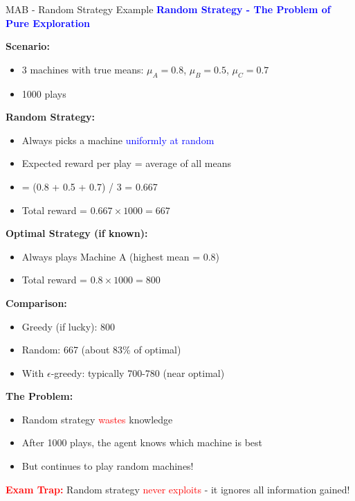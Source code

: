 \documentclass[8pt]{beamer}
\begin{document}
	\begin{frame}{MAB - Random Strategy Example}
		\fontsize{6.5}{7.5}\selectfont
		\textcolor{blue}{\textbf{Random Strategy - The Problem of Pure Exploration}}
		
		\textbf{Scenario:}
		\begin{itemize}
			\item 3 machines with true means: $\mu_A = 0.8$, $\mu_B = 0.5$, $\mu_C = 0.7$
			\item 1000 plays
		\end{itemize}
		
		\textbf{Random Strategy:}
		\begin{itemize}
			\item Always picks a machine \textcolor{blue}{uniformly at random}
			\item Expected reward per play = average of all means
			\item = (0.8 + 0.5 + 0.7) / 3 = 0.667
			\item Total reward = $0.667 \times 1000 = 667$
		\end{itemize}
		
		\textbf{Optimal Strategy (if known):}
		\begin{itemize}
			\item Always plays Machine A (highest mean = 0.8)
			\item Total reward = $0.8 \times 1000 = 800$
		\end{itemize}
		
		\textbf{Comparison:}
		\begin{itemize}
			\item Greedy (if lucky): 800
			\item Random: 667 (about 83\% of optimal)
			\item With $\epsilon$-greedy: typically 700-780 (near optimal)
		\end{itemize}
		
		\textbf{The Problem:}
		\begin{itemize}
			\item Random strategy \textcolor{red}{wastes} knowledge
			\item After 1000 plays, the agent knows which machine is best
			\item But continues to play random machines!
		\end{itemize}
		
		\textcolor{red}{\textbf{Exam Trap:}} Random strategy \textcolor{red}{never exploits} - it ignores all information gained!
	\end{frame}
	
\end{document}
